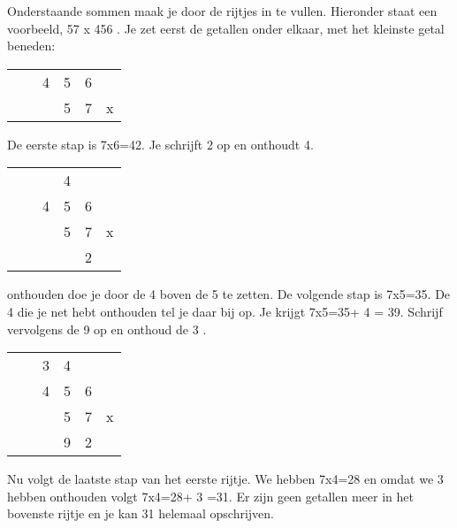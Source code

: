 \documentclass{article}
\begin{document}
\noindent Onderstaande sommen maak je door de rijtjes in te vullen. Hieronder staat een voorbeeld, 57 x 456 . Je zet eerst de getallen onder elkaar, met het kleinste getal beneden:\newline

\begin{tabular}{llllll}
&&4&5&\color{orange}6\color{black}&\\
&&&5&\color{orange}7\color{black}&x\\
\hline
\end{tabular}\newline
\newline
\newline
De eerste stap is \color{orange}7\color{black}x\color{orange}6\color{black}=42. Je schrijft 2 op en onthoudt \color{red}4\color{black}.\newline
\newline
\begin{tabular}{llllll}
&&&\color{red}4\color{black}&&\\
&&4&5\color{black}&\color{orange}6&\\
&&&5&\color{orange}7\color{black}&x\\
\hline
&&&&2&\\
\end{tabular}\newline
\newline
onthouden doe je door de \color{red} 4 \color{black} boven de 5 te zetten. De volgende stap is \color{orange}7\color{black}x\color{orange}5\color{black}=35. De \color{red} 4 \color{black} die je net hebt onthouden tel je daar bij op. Je krijgt  \color{orange}7\color{black}x\color{orange}5\color{black}=35+ \color{red} 4 \color{black} = 39. Schrijf vervolgens de 9 op en onthoud de  \color{blue} 3 \color{black}. \newline
\newline
\begin{tabular}{llllll}
&& \color{blue}3\color{black}&\color{red}4&&\\
&&4&\color{orange}5&6&\\
&&&5&\color{orange}7&x\\
\hline
&&&9&2&\\
\end{tabular}\newline
\newline
Nu volgt de laatste stap van het eerste rijtje. We hebben \color{orange}7\color{black}x\color{orange}4\color{black}=28 en omdat we  \color{blue} 3 \color{black} hebben onthouden volgt \color{orange}7\color{black}x\color{orange}4\color{black}=28+ \color{blue} 3 \color{black}=31. Er zijn geen getallen meer in het bovenste rijtje en je kan 31 helemaal opschrijven. \newline 
\end{document}
